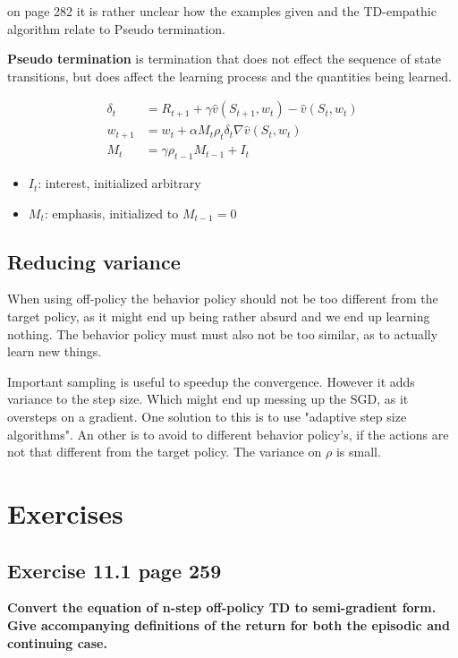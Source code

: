 on page 282 it is rather unclear how the examples given and the TD-empathic algorithm relate to Pseudo termination.

\textbf{Pseudo termination} is termination that does not effect the sequence of state transitions, but does affect the learning process and the quantities being learned.

\begin{equation}
\begin{split}
\delta_t & = R_{t+1} + \gamma \hat{v}(S_{t+1}, w_t) - \hat{v}(S_t, w_t) \\
w_{t+1} & = w_t + \alpha M_t \rho_t \delta_t \nabla \hat{v}(S_t, w_t) \\
M_t & = \gamma \rho_{t-1} M_{t-1} + I_t
\end{split}
\label{eq:empathic-TD methods}
\end{equation}

\begin{itemize}
	\item $I_t$: interest, initialized arbitrary
	\item $M_t$: emphasis, initialized to $M_{t-1}=0$
\end{itemize}

\subsection{Reducing variance}
When using off-policy the behavior policy should not be too different from the target policy, as it might end up being rather absurd and we end up learning nothing. The behavior policy must must also not be too similar, as to actually learn new things.

Important sampling is useful to speedup the convergence. However it adds variance to the step size. Which might end up messing up the SGD, as it oversteps on a gradient. One solution to this is to use "adaptive step size algorithms". An other is to avoid to different behavior policy's, if the actions are not that different from the target policy. The variance on $\rho$ is small.

\section{Exercises}

\subsection{Exercise 11.1 page 259}
\textbf{Convert the equation of n-step off-policy TD to semi-gradient form. Give accompanying definitions of the return for both the episodic and continuing case.}

